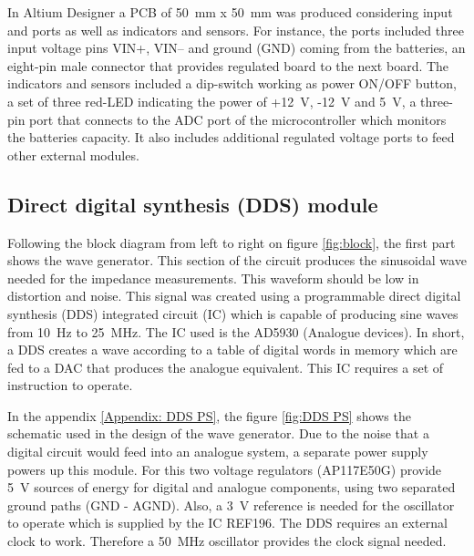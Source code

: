In Altium Designer a PCB of \SI{50}{\milli\meter} x \SI{50}{\milli\meter} was produced considering input and ports as well as indicators and sensors. For instance, the ports included three input voltage pins VIN+, VIN– and ground (GND) coming from the batteries, an eight-pin male connector that provides regulated board to the next board. The indicators and sensors included a dip-switch working as power ON/OFF button, a set of three red-LED indicating the power of +\SI{12}{\volt}, -\SI{12}{\volt} and \SI{5}{\volt}, a three-pin port that connects to the ADC port of the microcontroller which monitors the batteries capacity. It also includes additional regulated voltage ports to feed other external modules.


\subsection{Direct digital synthesis (DDS) module}
\label{section DDS}
Following the block diagram from left to right on figure \ref{fig:block}, the first part shows the wave generator. This section of the circuit produces the sinusoidal wave needed for the impedance measurements. This waveform should be low in distortion and noise. This signal was created using a programmable direct digital synthesis (DDS) integrated circuit (IC) which is capable of producing sine waves from \SI{10}{\hertz} to \SI{25}{\mega\hertz}. The IC used is the AD5930 (Analogue devices). In short, a DDS creates a wave according to a table of digital words in memory which are fed to a DAC that produces the analogue equivalent. This IC requires a set of instruction to operate. 

In the appendix \ref{Appendix: DDS PS}, the figure \ref{fig:DDS PS} shows the schematic used in the design of the wave generator. Due to the noise that a digital circuit would feed into an analogue system, a separate power supply powers up this module. For this two voltage regulators (AP117E50G) provide \SI{5}{\volt} sources of energy for digital and analogue components, using two separated ground paths (GND - AGND). Also, a \SI{3}{\volt} reference is needed for the oscillator to operate which is supplied by the IC REF196. The DDS requires an external clock to work. Therefore a \SI{50}{\mega\hertz} oscillator provides the clock signal needed.

